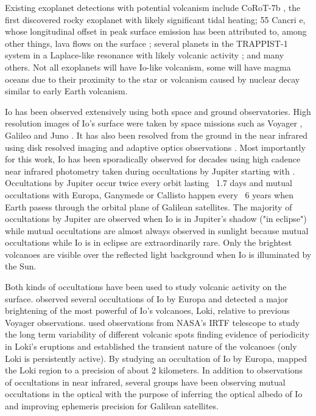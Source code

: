 \documentclass[modern]{aastex62}
\begin{document}
Existing exoplanet detections with potential volcanism include CoRoT-7b \citep{barnes_corot-7b_2010}, the first discovered rocky exoplanet with likely significant tidal heating; 55 Cancri e, whose longitudinal offset in peak surface emission has been attributed to, among other things, lava flows on the surface \citep{demory_variability_2016,demory_map_2016,hammond_linking_2017}; several planets in the TRAPPIST-1 system in a Laplace-like resonance with likely volcanic activity \citep{kislyakova_magma_2017,dobos_tidal_2019}; and many others.
Not all exoplanets will have Io-like volcanism, some will have magma oceans due to their proximity to the star or volcanism caused by nuclear decay similar to early Earth volcanism.

Io has been observed extensively using both space and ground observatories.
High resolution images of Io's surface were taken by space missions such as Voyager \citep{smith_jupiter_1979}, Galileo \citep{belton_galileos_1996} and Juno \citep{mura_infrared_2020}.
It has also been resolved from the ground in the near infrared using disk resolved imaging
\citep{howell_infrared_1985,simonelli_disk-resolved_1986,spencer_discovery_1990} and adaptive optics observations \citep{marchis_adaptive_2000,marchis_keck_2005,de_kleer_spatial_2016}.
Most importantly for this work, Io has been sporadically observed for decades using high cadence near infrared photometry taken during occultations by Jupiter starting with \cite{spencer_discovery_1990}.
Occultations by Jupiter occur twice every orbit lasting ~1.7 days and mutual occultations with Europa, Ganymede or Callisto happen every ~6 years when Earth pasess through the orbital plane of Galilean satellites.
The majority of occultations by Jupiter are observed when Io is in Jupiter's shadow ("in eclipse") while mutual occultations are almost always observed in sunlight because mutual occultations while Io is in eclipse are extraordinarily rare.
Only the brightest volcanoes are visible over the reflected light background when Io is illuminated by the Sun\citep{veeder_ios_1994,de_kleer_spatial_2016}.

Both kinds of occultations have been used to study volcanic activity on the surface.
\cite{spencer_io_1994} observed several occultations of Io by Europa and detected a major brightening of the most powerful of Io's volcanoes, Loki, relative to previous Voyager observations.
\cite{rathbun_loki_2002, rathbun_loki_2006,rathbun_ground-based_2010} used observations from NASA's IRTF telescope to study the long term variability of different volcanic spots finding evidence of periodicity in Loki's eruptions and established the transient nature of the volcanoes (only Loki is persistently active).
By studying an occultation of Io by Europa, \cite{de_kleer_multi-phase_2017} mapped the Loki region to a precision of about 2 kilometers.
In addition to observations of occultations in near infrared, several groups have been observing mutual occultations in the optical \citep[][and references therein]{arlot_mutual_1974,saquet_phemu15_2018,morgado_astrometry_2016} with the purpose of inferring the optical albedo of Io and improving ephemeris precision for Galilean satellites.
\end{document}
